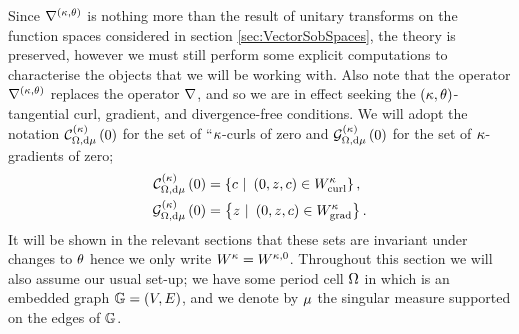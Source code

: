 Since $\nabla^{\left( \kappa, \theta \right)}$ is nothing more than the result of unitary transforms on the function spaces considered in section \ref{sec:VectorSobSpaces}, the theory is preserved, however we must still perform some explicit computations to characterise the objects that we will be working with.
Also note that the operator $\nabla^{\left( \kappa, \theta \right)}$ replaces the operator $\nabla$, and so we are in effect seeking the $\left( \kappa,\theta \right)$-tangential curl, gradient, and divergence-free conditions. 
We will adopt the notation $\mathcal{C}_{ \Omega, \mathrm{d}\mu}^{(\kappa)}\left( 0 \right)$ for the set of ``$\kappa$-curls of zero and $\mathcal{G}_{ \Omega, \mathrm{d}\mu}^{(\kappa)}\left( 0 \right)$ for the set of $\kappa$-gradients of zero;
\begin{align*}
	\kcurlZero{\ddom}{\ddmes} &= \clbracs{ c \ \vert \ \bracs{0,z,c}\in W^{\wavenumber}_{\mathrm{curl}}}, \\
	\kgradZero{\ddom}{\ddmes} &= \clbracs{ z \ \vert \ \bracs{0,z,c}\in W^{\wavenumber}_{\mathrm{grad}}}.
\end{align*}
It will be shown in the relevant sections that these sets are invariant under changes to $\theta$ hence we only write $W^{\kappa} = W^{\kappa, 0}$.
Throughout this section we will also assume our usual set-up; we have some period cell $\Omega$ in which is an embedded graph $\mathbb{G}=\left( V,E \right)$, and we denote by $\mu$ the singular measure supported on the edges of $\mathbb{G}$.

